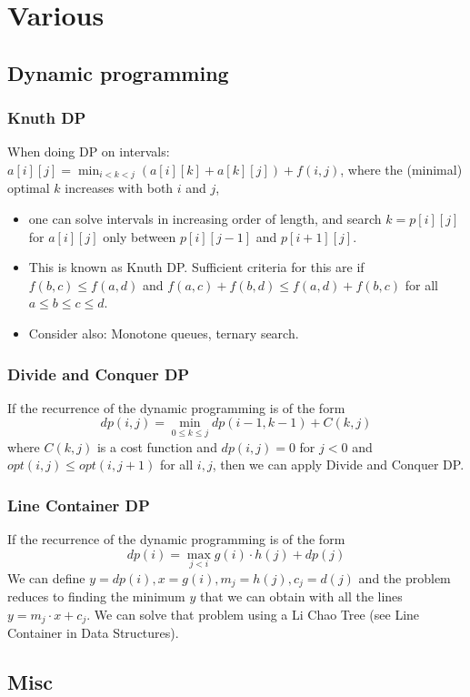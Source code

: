 \chapter{Various}

\section{Dynamic programming}
	\subsection{Knuth DP}
		When doing DP on intervals: $a[i][j] = \min_{i < k < j}(a[i][k] + a[k][j]) + f(i, j)$, where the (minimal) optimal $k$ increases with both $i$ and $j$,
		\begin{itemize}
		\item one can solve intervals in increasing order of length, and search $k = p[i][j]$ for $a[i][j]$ only between $p[i][j-1]$ and $p[i+1][j]$.
		\item This is known as Knuth DP. Sufficient criteria for this are if $f(b,c) \le f(a,d)$ and $f(a,c) + f(b,d) \le f(a,d) + f(b,c)$ for all $a \le b \le c \le d$.
		\item Consider also: Monotone queues, ternary search.
		\end{itemize}
	\subsection{Divide and Conquer DP}
		If the recurrence of the dynamic programming is of the form
		$$dp(i,j) = \min_{0 \le k \le j}{dp(i-1,k-1)+C(k,j)}$$
		where $C(k,j)$ is a cost function and $dp(i,j) = 0$ for $j < 0$ and $opt(i,j) \le opt(i,j+1)$ for all $i,j$, then we can apply Divide and Conquer DP.
	\subsection{Line Container DP}
		If the recurrence of the dynamic programming is of the form
		$$dp(i) = \max_{j<i}{g(i) \cdot h(j) + dp(j)}$$
		We can define $y = dp(i), x = g(i), m_j = h(j), c_j = d(j)$ and the problem reduces to finding the minimum $y$ that we can obtain with all the lines $y = m_j \cdot x + c_j$.
		We can solve that problem using a Li Chao Tree (see Line Container in Data Structures).
\section{Misc}

